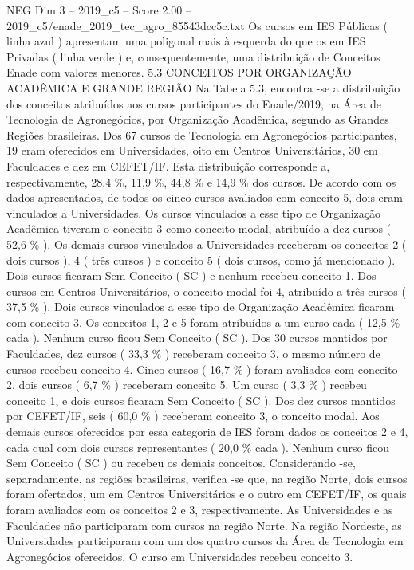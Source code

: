 \begin{textsample}{NEG Dim 3 – 2019\_c5 – Score 2.00 – 2019\_c5/enade\_2019\_tec\_agro\_85543dcc5c.txt}
Os cursos em IES Públicas ( linha azul ) apresentam uma poligonal mais à esquerda do que os em IES Privadas ( linha verde ) e, consequentemente, uma distribuição de Conceitos Enade com valores menores. 5.3 CONCEITOS POR ORGANIZAÇÃO ACADÊMICA E GRANDE REGIÃO Na Tabela 5.3, encontra -se a distribuição dos conceitos atribuídos aos cursos participantes do Enade/2019, na Área de Tecnologia de Agronegócios, por Organização Acadêmica, segundo as Grandes Regiões brasileiras.
Dos 67 cursos de Tecnologia em Agronegócios participantes, 19 eram oferecidos em Universidades, oito em Centros Universitários, 30 em Faculdades e dez em CEFET/IF.
Esta distribuição corresponde a, respectivamente, 28,4 \%, 11,9 \%, 44,8 \% e 14,9 \% dos cursos.
De acordo com os dados apresentados, de todos os cinco cursos avaliados com conceito 5, dois eram vinculados a Universidades.
Os cursos vinculados a esse tipo de Organização Acadêmica tiveram o conceito 3 como conceito modal, atribuído a dez cursos ( 52,6 \% ).
Os demais cursos vinculados a Universidades receberam os conceitos 2 ( dois cursos ), 4 ( três cursos ) e conceito 5 ( dois cursos, como já mencionado ).
Dois cursos ficaram Sem Conceito ( SC ) e nenhum recebeu conceito 1.
Dos cursos em Centros Universitários, o conceito modal foi 4, atribuído a três cursos ( 37,5 \% ).
Dois cursos vinculados a esse tipo de Organização Acadêmica ficaram com conceito 3.
Os conceitos 1, 2 e 5 foram atribuídos a um curso cada ( 12,5 \% cada ).
Nenhum curso ficou Sem Conceito ( SC ).
Dos 30 cursos mantidos por Faculdades, dez cursos ( 33,3 \% ) receberam conceito 3, o mesmo número de cursos recebeu conceito 4.
Cinco cursos ( 16,7 \% ) foram avaliados com conceito 2, dois cursos ( 6,7 \% ) receberam conceito 5.
Um curso ( 3,3 \% ) recebeu conceito 1, e dois cursos ficaram Sem Conceito ( SC ).
Dos dez cursos mantidos por CEFET/IF, seis ( 60,0 \% ) receberam conceito 3, o conceito modal.
Aos demais cursos oferecidos por essa categoria de IES foram dados os conceitos 2 e 4, cada qual com dois cursos representantes ( 20,0 \% cada ).
Nenhum curso ficou Sem Conceito ( SC ) ou recebeu os demais conceitos.
Considerando -se, separadamente, as regiões brasileiras, verifica -se que, na região Norte, dois cursos foram ofertados, um em Centros Universitários e o outro em CEFET/IF, os quais foram avaliados com os conceitos 2 e 3, respectivamente.
As Universidades e as Faculdades não participaram com cursos na região Norte.
Na região Nordeste, as Universidades participaram com um dos quatro cursos da Área de Tecnologia em Agronegócios oferecidos.
O curso em Universidades recebeu conceito 3.

\end{textsample}
